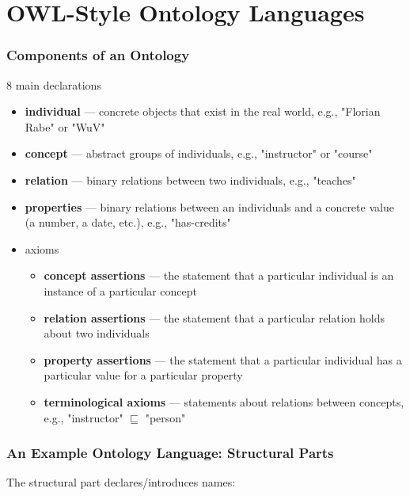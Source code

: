 \section{OWL-Style Ontology Languages}

\begin{frame}\frametitle{Components of an Ontology}
8 main declarations
\begin{itemize}
 \item \textbf{individual} --- concrete objects that exist in the real world, e.g., "Florian Rabe" or "WuV"
 \item \textbf{concept} --- abstract groups of individuals, e.g., "instructor" or "course"
 \item \textbf{relation} --- binary relations between two individuals, e.g., "teaches"
 \item \textbf{properties} --- binary relations between an individuals and a concrete value (a number, a date, etc.), e.g., "has-credits"
 \item axioms
  \begin{itemize}
   \item \textbf{concept assertions} --- the statement that a particular individual is an instance of a particular concept
   \item \textbf{relation assertions} --- the statement that a particular relation holds about two individuals
   \item \textbf{property assertions} --- the statement that a particular individual has a particular value for a particular property
   \item \textbf{terminological axioms} --- statements about relations between concepts, e.g., "instructor" $\sqsubseteq$ "person"
  \end{itemize}
\end{itemize}
\end{frame}

\begin{frame}\frametitle{An Example Ontology Language: Structural Parts}
The structural part declares/introduces names:
\begin{commgrammar}
\\
\\
\\
\\
\\
\\
\\
\\
\\
\\
\end{commgrammar}
\end{frame}

